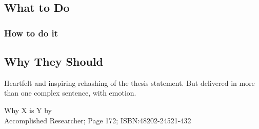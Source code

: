 \documentclass[oneside,12pt,letterpaper]{article}
\begin{document}
\subsection{What to Do}
\subsubsection{How to do it}
\subsection{Why They Should}

Heartfelt and inspiring rehashing of the thesis statement. %
But delivered in more than one complex sentence, with emotion. %

\begin{thebibliography}

 Why X is Y by \\ Accomplished Researcher; Page 172; ISBN:48202-24521-432

\end{thebibliography}
\end{document}
